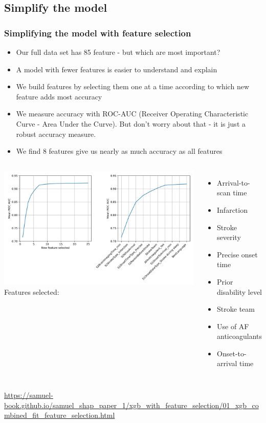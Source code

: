 \documentclass[xcolor={usenames,dvipsnames}]{beamer}
\newcommand{\smallurl}[1]{\textcolor{blue}{\fontsize{4pt}{4.8pt}\selectfont \url{#1}}}
\begin{document}
\subsection{Simplify the model} 
\begin{frame}
\frametitle{Simplifying the model with feature selection}

\begin{itemize}
    \tiny 
    \item Our full data set has 85 feature - but which are most important?
    \item A model with fewer features is easier to understand and explain
    \item We build features by selecting them one at a time according to which new feature adds most accuracy
    \item We measure accuracy with ROC-AUC (Receiver Operating Characteristic Curve - Area Under the Curve). But don’t worry about that - it is just a robust accuracy measure.
    \item We find 8 features give us nearly as much accuracy as all features
\end{itemize}

\vspace{0.5em}

\begin{columns}
    \includegraphics[width=1.0\textwidth]{./images/feature_selection_curves}
    \tiny
    Features selected:
    \begin{itemize}
        \tiny
        \item Arrival-to-scan time
        \item Infarction
        \item Stroke severity
        \item Precise onset time
        \item Prior disability level
        \item Stroke team
        \item Use of AF anticoagulants
        \item Onset-to-arrival time
    \end{itemize}
    \normalsize 
\end{columns}

\smallurl{https://samuel-book.github.io/samuel_shap_paper_1/xgb_with_feature_selection/01_xgb_combined_fit_feature_selection.html}

\end{frame}
\end{document}
